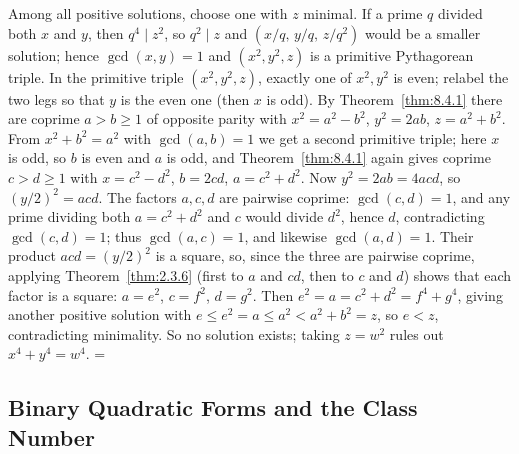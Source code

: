 \documentclass[11pt]{article}
\makeatletter
\theoremstyle{ntstyle}
\let\nt@closedisplay\]
\def\nt@guardedclose{\@ifnextchar\par{\nt@closeafterpar}{\@ifnextchar\end{\postdisplaypenalty\@M\nt@closedisplay}{\nt@closedisplay}}}
\def\nt@closeafterpar\par{\@ifnextchar\par{\nt@closeafterpar}{\@ifnextchar\end{\postdisplaypenalty\@M\nt@closedisplay\par}{\nt@closedisplay\par}}}
\renewenvironment{proof}[1][\proofname]{\par
  \pushQED{\qed}\normalfont\topsep\medskipamount\edef\nt@afterproof{\@endparpenalty=\the\@endparpenalty\relax}\@beginparpenalty\@M\@endparpenalty\@M\let\]\nt@guardedclose\trivlist\item[]\textit{#1\@addpunct{.}} \ignorespaces}{\ifvmode\addpenalty\@M\fi\popQED\nt@afterproof\endtrivlist\@endpefalse}
\makeatother
\begin{document}
\begin{proof} Among all positive solutions, choose one
	with $z$ minimal. If a prime $q$ divided both $x$ and $y$, then $q^{4}\mid
		z^{2}$, so $q^{2}\mid z$ and $(x/q,\,y/q,\,z/q^{2})$ would be a smaller
	solution; hence $\gcd(x, y)=1$ and $(x^{2},y^{2},z)$ is a primitive
	Pythagorean triple. In the primitive triple $(x^{2},y^{2},z)$, exactly one of $x^{2},y^{2}$ is
	even; relabel the two legs so that $y$ is the even one (then $x$ is odd). By
	Theorem~\ref{thm:8.4.1} there are coprime $a>b\ge1$ of opposite parity with $x^{2}=a^{2}-b^{2}$,
	$y^{2}=2ab$, $z=a^{2}+b^{2}$. From $x^{2}+b^{2}=a^{2}$ with $\gcd(a, b)=1$ we get a second
	primitive triple; here $x$ is odd, so $b$ is even and $a$ is odd, and
	Theorem~\ref{thm:8.4.1} again gives coprime $c>d\ge1$ with $x=c^{2}-d^{2}$,
	$b=2cd$, $a=c^{2}+d^{2}$. Now $y^{2}=2ab=4acd$, so $(y/2)^{2}=acd$.
	The factors $a,c,d$ are pairwise coprime: $\gcd(c, d)=1$, and any
	prime dividing both $a=c^{2}+d^{2}$ and $c$ would divide $d^{2}$,
	hence $d$, contradicting $\gcd(c, d)=1$; thus $\gcd(a, c)=1$, and
	likewise $\gcd(a, d)=1$. Their product $acd=(y/2)^{2}$ is a square,
	so, since the three are pairwise coprime, applying Theorem~\ref{thm:2.3.6} (first
	to $a$ and $cd$, then to $c$ and $d$) shows that each factor is a square:
	$a=e^{2}$, $c=f^{2}$, $d=g^{2}$. Then
	$e^{2}=a=c^{2}+d^{2}=f^{4}+g^{4}$, giving another positive solution with
	$e\le e^{2}=a\le a^{2}<a^{2}+b^{2}=z$, so $e<z$, contradicting
	minimality. So no solution exists; taking $z=w^{2}$ rules out
	$x^{4}+y^{4}=w^{4}$.
\end{proof}
\subsection{Binary Quadratic Forms and the Class Number}
\end{document}
